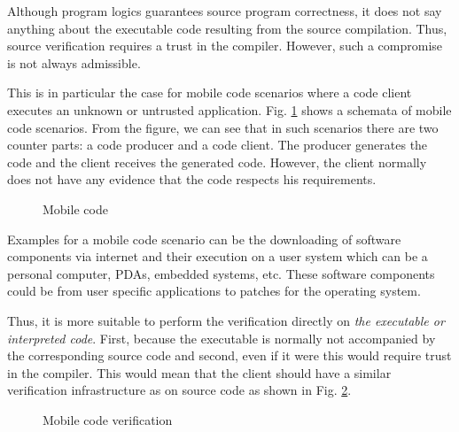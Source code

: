 Although  program logics  guarantees source program correctness, it does not say anything about the executable code
resulting from the source compilation. Thus, source verification requires a  trust in the compiler.
However,  such a compromise is not always admissible. 



This is in particular  the case for mobile code scenarios  where a code client
executes an unknown or untrusted application. 
Fig. \ref{intro:mobile} shows a schemata of mobile code scenarios. From the figure, we can see that in such scenarios 
there are two counter parts:  a code producer and a code client. The producer generates the code and the client 
receives the generated code. However, the client  normally does not have any evidence that the code respects his requirements.
\begin{figure}[ht!]
\begin{center}
\caption{\sc Mobile code}
\label{intro:mobile}
\end{center}
\end{figure} 

Examples for a mobile code scenario can be the downloading of software components  via internet  and their execution  on a user system which can be a personal computer,
 PDAs, embedded systems, etc. These software components could be from user specific applications to patches for the operating system.

 


Thus, it is more suitable to perform the verification  directly on \textit{the executable or interpreted code}.
First, because the executable is normally not accompanied by the corresponding source code and second, even if it were this would require 
trust in the compiler.  This would mean that  the client should 
have a similar verification infrastructure as on source code as shown in Fig. \ref{intro:mobileVerif}.

\begin{figure}[ht!]
\begin{center}
\caption{\sc Mobile code verification}
\label{intro:mobileVerif}
\end{center}
\end{figure}

